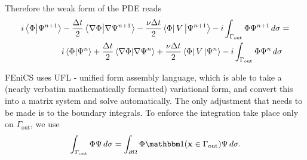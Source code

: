 \documentclass[../../main.tex]{subfiles}
\begin{document}
Therefore the weak form of the PDE reads
\begin{equation}
		\label{eq:weak-form-mark-1}
		\begin{split}
				i \bra{\Phi}\ket{\Psi^{n+1}} 
				& - 
				\frac{\Delta t}{2} \bra{\nabla \Phi}\ket{\nabla \Psi^{n+1}} -
				\frac{\nu \Delta t}{2} \bra{\Phi} V \ket{\Psi^{n+1}} -
				i \int_{\Gamma_\mathrm{out}} \Phi \Psi^{n+1} \, d\sigma = \\
				& i \bra{\Phi}\ket{\Psi^n} + 
				\frac{\Delta t}{2} \bra{\nabla \Phi}\ket{\nabla \Psi^n} + 
				\frac{\nu \Delta t}{2} \bra{\Phi} V \ket{\Psi^n} - 
				i \int_{\Gamma_\mathrm{out}} \Phi \Psi^n \, d\sigma 
		\end{split}
\end{equation}

FEniCS uses UFL - unified form assembly language, which 
is able to take a (nearly verbatim mathematically formatted) 
variational form, and convert this into a matrix system and solve 
automatically.  
The only adjustment that needs to be made is to the boundary integrals. 
To enforce the integration take place only on 
$\Gamma_{\mathrm{out}}$, we use 
\[
		\int_{\Gamma_\mathrm{out}} \Phi \Psi \, d\sigma = 
		\int_{\partial \Omega} \Phi \mathbbm 1(\vec x \in \Gamma_\mathrm{out})
		\Psi \, d\sigma
.\] 
\end{document}
